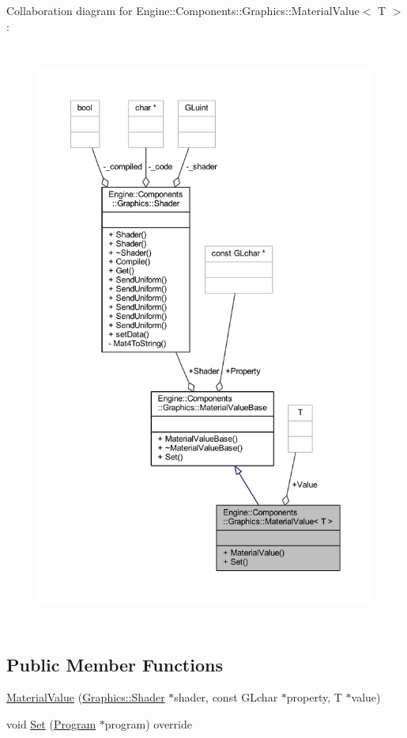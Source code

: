 Collaboration diagram for Engine\+:\+:Components\+:\+:Graphics\+:\+:Material\+Value$<$ T $>$\+:
\nopagebreak
\begin{figure}[H]
\begin{center}
\leavevmode
\includegraphics[height=550pt]{classEngine_1_1Components_1_1Graphics_1_1MaterialValue__coll__graph}
\end{center}
\end{figure}
\subsection*{Public Member Functions}
\begin{DoxyCompactItemize}
\item 
\mbox{\hyperlink{classEngine_1_1Components_1_1Graphics_1_1MaterialValue_ac360e2391eea68445b15c3fafb536e40}{Material\+Value}} (\mbox{\hyperlink{classEngine_1_1Components_1_1Graphics_1_1Shader}{Graphics\+::\+Shader}} $\ast$shader, const G\+Lchar $\ast$property, T $\ast$value)
\item 
void \mbox{\hyperlink{classEngine_1_1Components_1_1Graphics_1_1MaterialValue_a88dbac3446bf9e78c7411e79c1b58977}{Set}} (\mbox{\hyperlink{classEngine_1_1Components_1_1Graphics_1_1Program}{Program}} $\ast$program) override
\end{DoxyCompactItemize}
